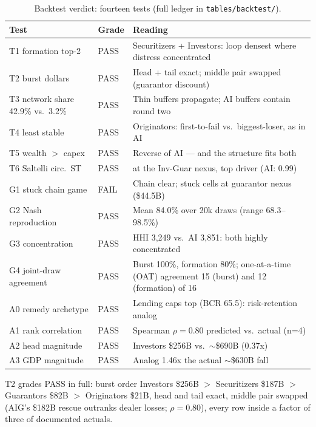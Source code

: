 \documentclass[11pt,a4paper]{article}
\begin{document}
\begin{table}[htbp]
\centering
\caption{Backtest verdict: fourteen tests (full ledger in \texttt{tables/backtest/}).}
    \label{tab:35-backtest-verdict-four}
{\small
\begin{tabular}{>{\raggedright\arraybackslash}p{3.4cm}>{\raggedright\arraybackslash}p{1.6cm}>{\raggedright\arraybackslash}p{6.4cm}}
\toprule
Test & Grade & Reading \\
\midrule
T1 formation top-2 & PASS & Securitizers + Investors: loop densest where distress concentrated \\
T2 burst dollars & PASS & Head + tail exact; middle pair swapped (guarantor discount) \\
T3 network share 42.9\% vs.\ 3.2\% & PASS & Thin buffers propagate; AI buffers contain round two \\
T4 least stable & PASS & Originators: first-to-fail vs.\ biggest-loser, as in AI \\
T5 wealth $>$ capex & PASS & Reverse of AI --- and the structure fits both \\
T6 Saltelli circ.\ ST & PASS & 0.97 at the Inv-Guar nexus, top driver (AI: 0.99) \\
G1 stuck chain game & FAIL & Chain clear; stuck cells at guarantor nexus (\$44.5B) \\
G2 Nash reproduction & PASS & Mean 84.0\% over 20k draws (range 68.3--98.5\%) \\
G3 concentration & PASS & HHI 3,249 vs.\ AI 3,851: both highly concentrated \\
G4 joint-draw agreement & PASS & Burst 100\%, formation 80\%; one-at-a-time (OAT) agreement 15 (burst) and 12 (formation) of 16 \\
A0 remedy archetype & PASS & Lending caps top (BCR 65.5): risk-retention analog \\
A1 rank correlation & PASS & Spearman $\rho=0.80$ predicted vs.\ actual (n=4) \\
A2 head magnitude & PASS & Investors \$256B vs.\ $\sim$\$690B (0.37x) \\
A3 GDP magnitude & PASS & Analog 1.46x the actual $\sim$\$630B fall \\
\bottomrule
\end{tabular}
\par}
\end{table}

T2 grades PASS in full: burst order Investors \$256B $>$ Securitizers
\$187B $>$ Guarantors \$82B $>$ Originators \$21B, head and tail exact,
middle pair swapped (AIG's \$182B rescue outranks dealer losses;
$\rho=0.80$), every row inside a factor of three of documented actuals.
\end{document}
